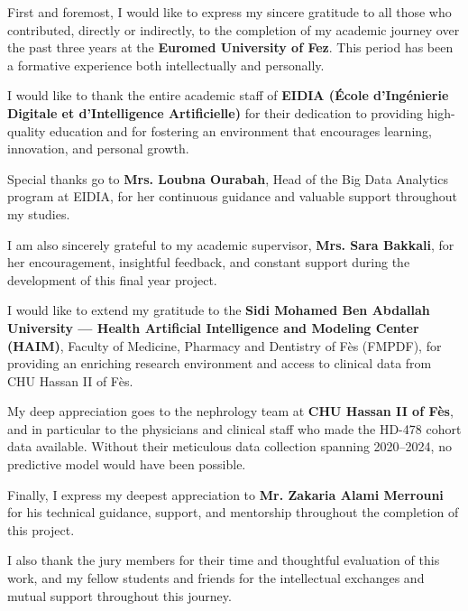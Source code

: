 \documentclass[12pt,a4paper,twoside]{report}
\begin{document}
First and foremost, I would like to express my sincere gratitude to all those who contributed, directly or indirectly, to the completion of my academic journey over the past three years at the \textbf{Euromed University of Fez}. This period has been a formative experience both intellectually and personally.

I would like to thank the entire academic staff of \textbf{EIDIA (École d'Ingénierie Digitale et d'Intelligence Artificielle)} for their dedication to providing high-quality education and for fostering an environment that encourages learning, innovation, and personal growth.

Special thanks go to \textbf{Mrs. Loubna Ourabah}, Head of the Big Data Analytics program at EIDIA, for her continuous guidance and valuable support throughout my studies.

I am also sincerely grateful to my academic supervisor, \textbf{Mrs. Sara Bakkali}, for her encouragement, insightful feedback, and constant support during the development of this final year project.

I would like to extend my gratitude to the \textbf{Sidi Mohamed Ben Abdallah University — Health Artificial Intelligence and Modeling Center (HAIM)}, Faculty of Medicine, Pharmacy and Dentistry of Fès (FMPDF), for providing an enriching research environment and access to clinical data from CHU Hassan II of Fès.

My deep appreciation goes to the nephrology team at \textbf{CHU Hassan II of Fès}, and in particular to the physicians and clinical staff who made the HD-478 cohort data available. Without their meticulous data collection spanning 2020--2024, no predictive model would have been possible.

Finally, I express my deepest appreciation to \textbf{Mr. Zakaria Alami Merrouni} for his technical guidance, support, and mentorship throughout the completion of this project.

I also thank the jury members for their time and thoughtful evaluation of this work, and my fellow students and friends for the intellectual exchanges and mutual support throughout this journey.

\end{document}
